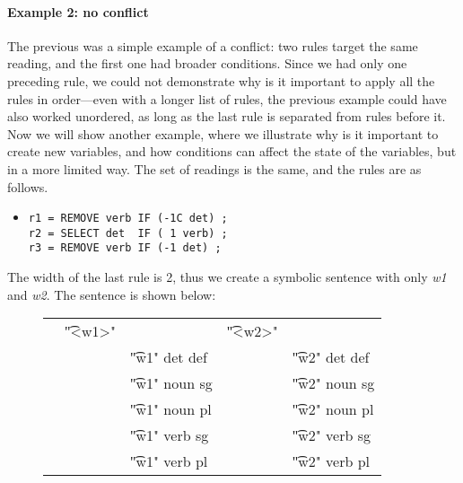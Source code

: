 \paragraph{Example 2: no conflict}
The previous was a simple example of a conflict: two rules target the same reading, and the first one had broader conditions.
Since we had only one preceding rule, we could not demonstrate why is it important to apply all the rules in order---even with a longer list of rules, the previous example could have also worked unordered, as long as the last rule is separated from rules before it.
Now we will show another example, where we illustrate why is it important to create new variables, and how conditions can affect the state of the variables, but in a more limited way. The set of readings is the same, and the rules are as follows.

\begin{itemize}
\item[]
\begin{verbatim}
r1 = REMOVE verb IF (-1C det) ;
r2 = SELECT det  IF ( 1 verb) ;
r3 = REMOVE verb IF (-1 det) ;
\end{verbatim}
\end{itemize}

\noindent The width of the last rule is 2, thus we create a symbolic sentence with only {\em w1} and {\em w2}. The sentence is shown below:

\begin{figure}[h]
\begin{tabular}{p{0.2cm} p{0.6cm} l  p{0.6cm} l }
& \t{"<w1>"}    &                     &  \t{"<w2>"}  &           \\
&              & \t{"w1" det def}    & &      \t{"w2" det def}  \\
&              & \t{"w1" noun sg}    & &      \t{"w2" noun sg}  \\
&              & \t{"w1" noun pl}    & &      \t{"w2" noun pl}  \\
&              & \t{"w1" verb sg}    & &      \t{"w2" verb sg}  \\
&              & \t{"w1" verb pl}    & &      \t{"w2" verb pl}  \\
\end{tabular}
\end{figure}



